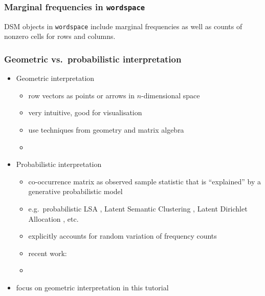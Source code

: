 \documentclass[t]{beamer} %
\begin{document}
\begin{frame}[fragile]
  \frametitle{Marginal frequencies in \texttt{wordspace}}
  
  DSM objects in \texttt{wordspace} include marginal frequencies as well as
  counts of nonzero cells for rows and columns.
\end{frame}

\begin{frame}
  \frametitle{Geometric vs.\ probabilistic interpretation}

  \begin{itemize}
  \item Geometric interpretation
    \begin{itemize}
    \item row vectors as points or arrows in $n$-dimensional space
    \item very intuitive, good for visualisation
    \item use techniques from geometry and matrix algebra
    \item[]
    \end{itemize}
    \pause
  \item Probabilistic interpretation
    \begin{itemize}
    \item co-occurrence matrix as observed sample statistic that is ``explained'' by a generative probabilistic model
    \item e.g.\ probabilistic LSA \citep{Hoffmann:99}, Latent Semantic
      Clustering \citep{Rooth:etc:99}, Latent Dirichlet Allocation
      \citep{Blei:Ng:Jordan:03}, etc.
    \item explicitly accounts for random variation of frequency counts
    \item recent work: 
    \item[]
    \end{itemize}
    \pause
  \item[\hand] focus on geometric interpretation in this tutorial
  \end{itemize}
\end{frame}
\end{document}
